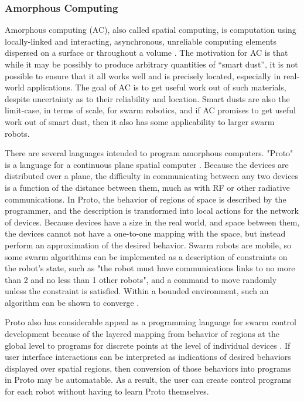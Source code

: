 \documentclass[]{article}
\begin{document}
\subsubsection{Amorphous Computing}

Amorphous computing (AC), also called spatial computing, is computation using locally-linked and interacting, asynchronous, unreliable computing elements dispersed on a surface or throughout a volume \cite{abelson2000amorphous}. 
The motivation for AC is that while it may be possibly to produce arbitrary quantities of ``smart dust'', it is not possible to ensure that it all works well and is precisely located, especially in real-world applications.
The goal of AC is to get useful work out of such materials, despite uncertainty as to their reliability and location. 
Smart dusts are also the limit-case, in terms of scale, for swarm robotics, and if AC promises to get useful work out of smart dust, then it also has some applicability to larger swarm robots.

There are several languages intended to program amorphous computers. 
"Proto" is a language for a continuous plane spatial computer \cite{correll2009ad}.
Because the devices are distributed over a plane, the difficulty in communicating between any two devices is a function of the distance between them, much as with RF or other radiative communications.
In Proto, the behavior of regions of space is described by the programmer, and the description is transformed into local actions for the network of devices. 
Because devices have a size in the real world, and space between them, the devices cannot not have a one-to-one mapping with the space, but instead perform an approximation of the desired behavior. 
Swarm robots are mobile, so some swarm algorithims can be implemented as a description of constraints on the robot's state, such as "the robot must have communications links to no more than 2 and no less than 1 other robots", and a command to move randomly unless the constraint is satisfied. 
Within a bounded environment, such an algorithm can be shown to converge \cite{correll2009ad}. 

Proto also has considerable appeal as a programming language for swarm control development because of the layered mapping from behavior of regions at the global level to programs for discrete points at the level of individual devices \cite{beal2006infrastructure}. 
If user interface interactions can be interpreted as indications of desired behaviors displayed over spatial regions, then conversion of those behaviors into programs in Proto may be automatable. 
As a result, the user can create control programs for each robot without having to learn Proto themselves.  
\end{document}
